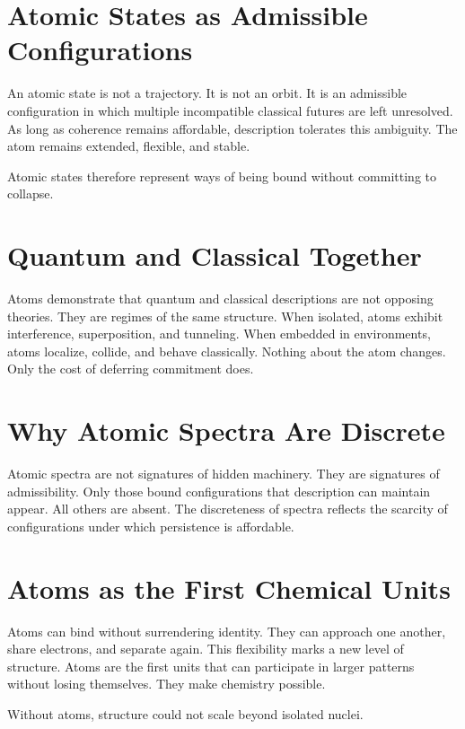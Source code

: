 \documentclass[11pt,twoside,openright]{book}
\begin{document}
\section*{Atomic States as Admissible Configurations}

An atomic state is not a trajectory. It is not an orbit. It is an admissible configuration in which multiple incompatible classical futures are left unresolved. As long as coherence remains affordable, description tolerates this ambiguity. The atom remains extended, flexible, and stable.

Atomic states therefore represent ways of being bound without committing to collapse.

\section*{Quantum and Classical Together}

Atoms demonstrate that quantum and classical descriptions are not opposing theories. They are regimes of the same structure. When isolated, atoms exhibit interference, superposition, and tunneling. When embedded in environments, atoms localize, collide, and behave classically. Nothing about the atom changes. Only the cost of deferring commitment does.

\section*{Why Atomic Spectra Are Discrete}

Atomic spectra are not signatures of hidden machinery. They are signatures of admissibility. Only those bound configurations that description can maintain appear. All others are absent. The discreteness of spectra reflects the scarcity of configurations under which persistence is affordable.

\section*{Atoms as the First Chemical Units}

Atoms can bind without surrendering identity. They can approach one another, share electrons, and separate again. This flexibility marks a new level of structure. Atoms are the first units that can participate in larger patterns without losing themselves. They make chemistry possible.

Without atoms, structure could not scale beyond isolated nuclei.
\end{document}
